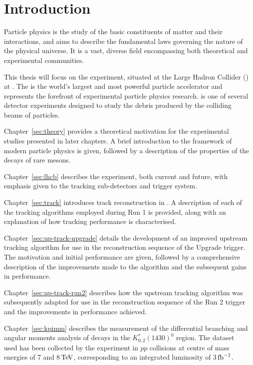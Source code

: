 \section{Introduction}
\label{sec:intro}

Particle physics is the study of the basic constituents of matter and their interactions, and aims to describe the fundamental laws governing the nature of the physical universe. It is a vast, diverse field encompassing both theoretical and experimental communities.

This thesis will focus on the \lhcb experiment, situated at the Large Hadron Collider (\lhc) at \cern. The \lhc is the world's largest and most powerful particle accelerator and represents the forefront of experimental particle physics research. \lhcb is one of several detector experiments designed to study the debris produced by the colliding beams of particles.

Chapter~\ref{sec:theory} provides a theoretical motivation for the experimental studies presented in later chapters. A brief introduction to the framework of modern particle physics is given, followed by a description of the properties of the decays of rare \B mesons.

Chapter~\ref{sec:lhcb} describes the \lhcb experiment, both current and future, with emphasis given to the tracking sub-detectors and trigger system.

Chapter~\ref{sec:track} introduces track reconstruction in \lhcb. A description of each of the tracking algorithms employed during \lhcb Run 1 is provided, along with an explanation of how tracking performance is characterised.

Chapter~\ref{sec:up-track-upgrade} details the development of an improved upstream tracking algorithm for use in the reconstruction sequence of the \lhcb Upgrade trigger. The motivation and initial performance are given, followed by a comprehensive description of the improvements made to the algorithm and the subsequent gains in performance. 

Chapter~\ref{sec:up-track-run2} describes how the upstream tracking algorithm was subsequently adapted for use in the reconstruction sequence of the \lhcb Run 2 trigger and the improvements in performance achieved.

Chapter~\ref{sec:kpimm} describes the measurement of the differential branching and angular moments analysis of \BdToKpimm decays in the $K^{*}_{0,2}(1430)^{0}$ region. The dataset used has been collected by the \lhcb experiment in $pp$ collisions at centre of mass energies of 7 and 8${\mathrm{\,Te\kern -0.1em V}}$, corresponding to an integrated luminosity of 3$\mbox{\,fb}^{-1}$.